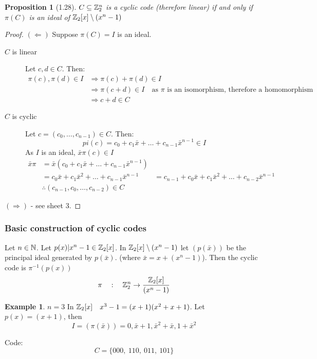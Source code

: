 \documentclass[]{article}
\newtheorem{prop}[thm]{Proposition}
\theoremstyle{definition}
\newtheorem*{exmp}{Example}
\theoremstyle{remark}
\numberwithin{equation}{section}
\begin{document}
				\begin{prop}[1.28]
					$C \subseteq \mathbb{Z}_2^n$ is a cyclic code (therefore linear) if and only if $\pi(C)$ is an ideal of $\mathbb{Z}_2[x] \setminus (x^n-1)$
				\end{prop}
				\begin{proof}
					$(\Leftarrow)$ Suppose $\pi(C)=I$ is an ideal.
					\begin{description}
						\item[$C$ is linear] Let $c,d \in C$. Then:
							\begin{align*}
								\pi(c), \pi(d) \in I &\Rightarrow \pi(c) + \pi(d) \in I\\
													 &\Rightarrow \pi(c+d) \in I\quad \text{as $\pi$ is an isomorphism, therefore a homomorphism}\\
													 &\Rightarrow c+d \in C
							\end{align*}
						\item[$C$ is cyclic]
							Let $c = (c_0, \hdots, c_{n-1}) \in C$. Then:
							\[
								pi(c) = c_0 + c_1 \bar{x} + \hdots + c_{n-1} \bar{x}^{n-1} \in I
							\]
							As $I$ is an ideal, $\bar{x}\pi(c) \in I$
							\begin{align*}
								\bar{x}\pi &= \bar{x}(c_0 + c_1 \bar{x} + \hdots + c_{n-1} \bar{x}^{n-1})\\
									&= c_0\bar{x} + c_1 \bar{x}^2 + \hdots + c_{n-1} \bar{x}^{n-1}
									&= c_{n-1} + c_0\bar{x} + c_1 \bar{x}^2 + \hdots + c_{n-2} \bar{x}^{n-1}\\
									&\therefore (c_{n-1}, c_0, \hdots, c_{n-2}) \in C
							\end{align*}
					\end{description}
					$(\Rightarrow)$ - see sheet 3.
				\end{proof}
			\subsubsection{Basic construction of cyclic codes}
			Let $n\in \mathbb N$. Let $p(x) | x^n-1 \in \mathbb{Z}_2[x]$. In $\mathbb{Z}_2[x] \setminus (x^n -1)$ let $(p(\bar{x}))$ be the principal ideal generated by $p(\bar{x})$.
			(where $\bar{x} = x + (x^n -1)$). Then the cyclic code is $\pi^{-1}(p(x))$
			\[
				\pi \quad : \quad \mathbb{Z}_2^n \rightarrow \frac{\mathbb{Z}_2[x]}{(x^n-1)}
			\]
			\begin{exmp} $n=3$
				In $\mathbb{Z}_2[x]\quad x^3 - 1 = (x+1)(x^2+x+1)$.
				Let $p(x) = (x+1)$, then
				\[
					I = (\pi(\bar{x})) = {0, \bar{x} +1, \bar{x}^2 + \bar{x}, 1 +\bar{x}^2}
				\]

				Code:
				\[
					C = \{000,\ 110,\ 011,\ 101\}
				\]
			\end{exmp}
\end{document}
